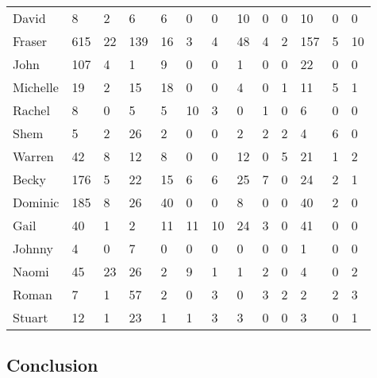 \begin{table}[!h]
\begin{tabular}{l|lll|lll|lll|lll}
David & 8 & 2 & 6 & 6 & 0 & 0 & 10 & 0 & 0 & 10 & 0 & 0 \\
Fraser & 615 & 22 & 139 & 16 & 3 & 4 & 48 & 4 & 2 & 157 & 5 & 10 \\
John & 107 & 4 & 1 & 9 & 0 & 0 & 1 & 0 & 0 & 22 & 0 & 0 \\
Michelle & 19 & 2 & 15 & 18 & 0 & 0 & 4 & 0 & 1 & 11 & 5 & 1 \\
Rachel & 8 & 0 & 5 & 5 & 10 & 3 & 0 & 1 & 0 & 6 & 0 & 0 \\
Shem & 5 & 2 & 26 & 2 & 0 & 0 & 2 & 2 & 2 & 4 & 6 & 0 \\
Warren & 42 & 8 & 12 & 8 & 0 & 0 & 12 & 0 & 5 & 21 & 1 & 2 \\
Becky & 176 & 5 & 22 & 15 & 6 & 6 & 25 & 7 & 0 & 24 & 2 & 1 \\
Dominic & 185 & 8 & 26 & 40 & 0 & 0 & 8 & 0 & 0 & 40 & 2 & 0 \\
Gail & 40 & 1 & 2 & 11 & 11 & 10 & 24 & 3 & 0 & 41 & 0 & 0 \\
Johnny & 4 & 0 & 7 & 0 & 0 & 0 & 0 & 0 & 0 & 1 & 0 & 0 \\
Naomi & 45 & 23 & 26 & 2 & 9 & 1 & 1 & 2 & 0 & 4 & 0 & 2 \\
Roman & 7 & 1 & 57 & 2 & 0 & 3 & 0 & 3 & 2 & 2 & 2 & 3 \\
Stuart & 12 & 1 & 23 & 1 & 1 & 3 & 3 & 0 & 0 & 3 & 0 & 1\\
\bottomrule
\end{tabular}
\end{table}
\FloatBarrier


\subsection{Conclusion}

